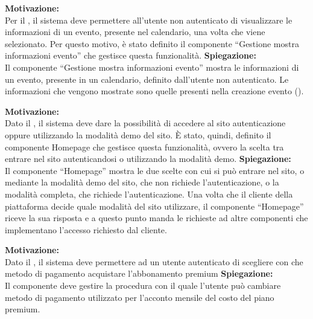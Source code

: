 \begin{listaPersonale}[ACI]{}

    \textbf{Motivazione:}\\
    Per il , il sistema deve permettere all'utente non autenticato di visualizzare le informazioni di un evento, presente nel calendario, una volta che viene selezionato. Per questo motivo, è stato definito il componente “Gestione mostra informazioni evento” che gestisce questa funzionalità.
    \textbf{Spiegazione:}\\
    Il componente “Gestione mostra informazioni evento” mostra le informazioni di un evento, presente in un calendario, definito dall'utente non autenticato. Le informazioni che vengono mostrate sono quelle presenti nella creazione evento ().



    \textbf{Motivazione:}\\
    Dato il , il sistema deve dare la possibilità di accedere al sito autenticazione oppure utilizzando la modalità demo del sito. È stato, quindi, definito il componente Homepage che gestisce questa funzionalità, ovvero la scelta tra entrare nel sito autenticandosi o utilizzando la modalità demo.
    \textbf{Spiegazione:}\\
    Il componente “Homepage” mostra le due scelte con cui si può entrare nel sito, o mediante la modalità demo del sito, che non richiede l'autenticazione, o la modalità completa, che richiede l'autenticazione. Una volta che il cliente della piattaforma decide quale modalità del sito utilizzare, il componente “Homepage” riceve la sua risposta e a questo punto manda le richieste ad altre componenti che implementano l'accesso richiesto dal cliente.


    \textbf{Motivazione:}\\
    Dato il , il sistema deve permettere ad un utente autenticato di scegliere con che metodo di pagamento acquistare l'abbonamento premium
    \textbf{Spiegazione:}\\
    Il componente deve gestire la procedura con il quale l'utente può cambiare metodo di pagamento utilizzato per l'acconto mensile del costo del piano premium.




\end{listaPersonale}
